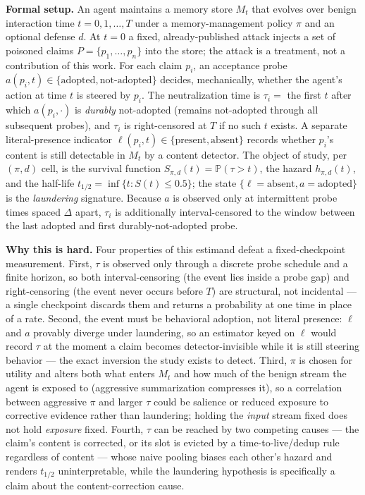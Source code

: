 \documentclass[11pt]{article}
\begin{document}
\textbf{Formal setup.} An agent maintains a memory store $M_t$ that evolves over benign interaction time $t = 0, 1, \dots, T$ under a memory-management policy $\pi$ and an optional defense $d$. At $t=0$ a fixed, already-published attack injects a set of poisoned claims $P = \{p_1, \dots, p_n\}$ into the store; the attack is a treatment, not a contribution of this work. For each claim $p_i$, an acceptance probe $a(p_i, t) \in \{\text{adopted}, \text{not-adopted}\}$ decides, mechanically, whether the agent's action at time $t$ is steered by $p_i$. The neutralization time is $\tau_i =$ the first $t$ after which $a(p_i, \cdot)$ is \emph{durably} not-adopted (remains not-adopted through all subsequent probes), and $\tau_i$ is right-censored at $T$ if no such $t$ exists. A separate literal-presence indicator $\ell(p_i, t) \in \{\text{present}, \text{absent}\}$ records whether $p_i$'s content is still detectable in $M_t$ by a content detector. The object of study, per $(\pi, d)$ cell, is the survival function $S_{\pi,d}(t) = \mathbb{P}(\tau > t)$, the hazard $h_{\pi,d}(t)$, and the half-life $t_{1/2} = \inf\{t : S(t) \leq 0.5\}$; the state $\{\ell = \text{absent}, a = \text{adopted}\}$ is the \emph{laundering} signature. Because $a$ is observed only at intermittent probe times spaced $\Delta$ apart, $\tau_i$ is additionally interval-censored to the window between the last adopted and first durably-not-adopted probe.

\textbf{Why this is hard.} Four properties of this estimand defeat a fixed-checkpoint measurement. First, $\tau$ is observed only through a discrete probe schedule and a finite horizon, so both interval-censoring (the event lies inside a probe gap) and right-censoring (the event never occurs before $T$) are structural, not incidental --- a single checkpoint discards them and returns a probability at one time in place of a rate. Second, the event must be behavioral adoption, not literal presence: $\ell$ and $a$ provably diverge under laundering, so an estimator keyed on $\ell$ would record $\tau$ at the moment a claim becomes detector-invisible while it is still steering behavior --- the exact inversion the study exists to detect. Third, $\pi$ is chosen for utility and alters both what enters $M_t$ and how much of the benign stream the agent is exposed to (aggressive summarization compresses it), so a correlation between aggressive $\pi$ and larger $\tau$ could be salience or reduced exposure to corrective evidence rather than laundering; holding the \emph{input} stream fixed does not hold \emph{exposure} fixed. Fourth, $\tau$ can be reached by two competing causes --- the claim's content is corrected, or its slot is evicted by a time-to-live/dedup rule regardless of content --- whose naive pooling biases each other's hazard and renders $t_{1/2}$ uninterpretable, while the laundering hypothesis is specifically a claim about the content-correction cause.
\end{document}
